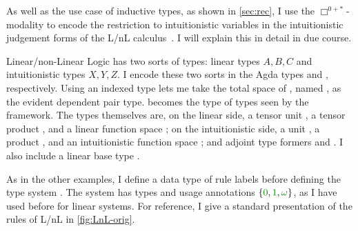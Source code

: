 As well as the use case of inductive types, as shown in \cref{sec:rec}, I use
the $\Box^{0{+}{*}}$-modality to encode the restriction to intuitionistic
variables in the intuitionistic judgement forms of the L/nL
calculus~\citep{Benton94}.
I will explain this in detail in due course.

Linear/non-Linear Logic has two sorts of types: linear types $A, B, C$ and
intuitionistic types $X, Y, Z$.
I encode these two sorts in the Agda types
\AgdaSpace{} and
\AgdaSpace{}, respectively.
Using an indexed type lets me take the total space of , named
, as the evident dependent pair type.
 becomes the type of types seen by the framework.
The types themselves are, on the linear side,
a tensor unit ,
a tensor product , and
a linear function space ;
on the intuitionistic side,
a unit ,
a product , and
an intuitionistic function space ;
and adjoint type formers  and
.
I also include a linear base type \AgdaInductiveConstructor{$\iota$}.


As in the other examples, I define a data type of rule labels
 before defining the type system .
The system  has types  and usage
annotations $\{\gr0, \gr1, \gr\omega\}$, as I have used before for linear
systems.
For reference, I give a standard presentation of the rules of L/nL in
\cref{fig:LnL-orig}.

